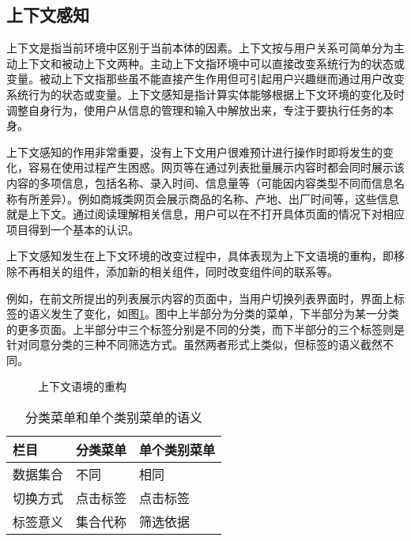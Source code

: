 \subsection{上下文感知}
上下文是指当前环境中区别于当前本体的因素。上下文按与用户关系可简单分为主动上下文和被动上下文两种。主动上下文指环境中可以直接改变系统行为的状态或变量。被动上下文指那些虽不能直接产生作用但可引起用户兴趣继而通过用户改变系统行为的状态或变量。上下文感知是指计算实体能够根据上下文环境的变化及时调整自身行为，使用户从信息的管理和输入中解放出来，专注于要执行任务的本身。

上下文感知的作用非常重要，没有上下文用户很难预计进行操作时即将发生的变化，容易在使用过程产生困惑。网页等在通过列表批量展示内容时都会同时展示该内容的多项信息，包括名称、录入时间、信息量等（可能因内容类型不同而信息名称有所差异）。例如商城类网页会展示商品的名称、产地、出厂时间等，这些信息就是上下文。通过阅读理解相关信息，用户可以在不打开具体页面的情况下对相应项目得到一个基本的认识。

上下文感知发生在上下文环境的改变过程中，具体表现为上下文语境的重构，即移除不再相关的组件，添加新的相关组件，同时改变组件间的联系等。

例如，在前文所提出的列表展示内容的页面中，当用户切换列表界面时，界面上标签的语义发生了变化，如图\ref{fig:context}。图中上半部分为分类的菜单，下半部分为某一分类的更多页面。上半部分中三个标签分别是不同的分类，而下半部分的三个标签则是针对同意分类的三种不同筛选方式。虽然两者形式上类似，但标签的语义截然不同。

\begin{figure}[htp]
\centering
{}
\caption{上下文语境的重构}
\label{fig:context}
\end{figure}

\begin{table}[htbp]
\centering
\caption{分类菜单和单个类别菜单的语义}
\vskip 5pt
\begin{tabular}{lll}
\toprule
栏目 & 分类菜单 & 单个类别菜单 \\
\midrule
数据集合 & 不同 & 相同 \\
切换方式  & 点击标签 & 点击标签 \\
标签意义 & 集合代称 & 筛选依据 \\
\bottomrule
\end{tabular}
\label{tab:collection}
\end{table}


